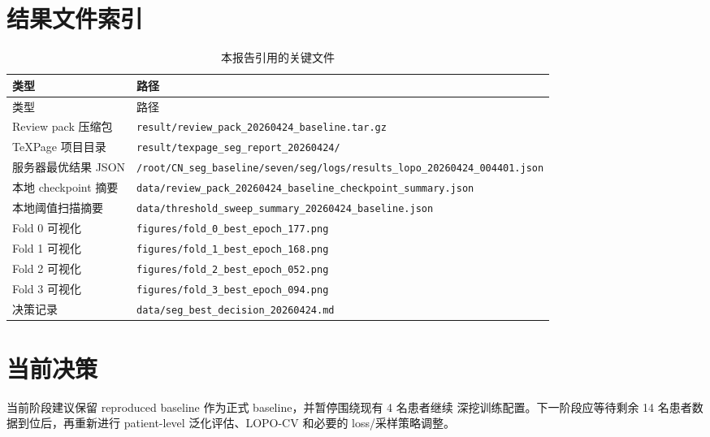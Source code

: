 \documentclass[UTF8,11pt]{ctexart}
\begin{document}
\section{结果文件索引}

\begin{longtable}{p{}p{}}
\caption{本报告引用的关键文件}\\
\toprule
类型 & 路径 \\
\midrule
\endfirsthead
\toprule
类型 & 路径 \\
\midrule
\endhead
Review pack 压缩包 & \texttt{result/review\_pack\_20260424\_baseline.tar.gz} \\
TeXPage 项目目录 & \texttt{result/texpage\_seg\_report\_20260424/} \\
服务器最优结果 JSON & \texttt{/root/CN\_seg\_baseline/seven/seg/logs/results\_lopo\_20260424\_004401.json} \\
本地 checkpoint 摘要 & \texttt{data/review\_pack\_20260424\_baseline\_checkpoint\_summary.json} \\
本地阈值扫描摘要 & \texttt{data/threshold\_sweep\_summary\_20260424\_baseline.json} \\
Fold 0 可视化 & \texttt{figures/fold\_0\_best\_epoch\_177.png} \\
Fold 1 可视化 & \texttt{figures/fold\_1\_best\_epoch\_168.png} \\
Fold 2 可视化 & \texttt{figures/fold\_2\_best\_epoch\_052.png} \\
Fold 3 可视化 & \texttt{figures/fold\_3\_best\_epoch\_094.png} \\
决策记录 & \texttt{data/seg\_best\_decision\_20260424.md} \\
\bottomrule
\end{longtable}

\section{当前决策}

当前阶段建议保留 reproduced baseline 作为正式 baseline，并暂停围绕现有 4 名患者继续
深挖训练配置。下一阶段应等待剩余 14 名患者数据到位后，再重新进行 patient-level
泛化评估、LOPO-CV 和必要的 loss/采样策略调整。
\end{document}
